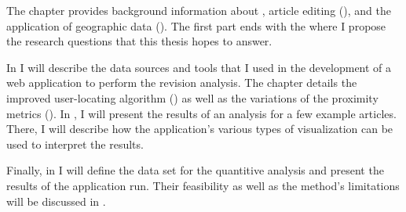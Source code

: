 The chapter  provides background information about , article editing (), and the application of geographic data ().
The first part ends with the  where I propose the research questions that this thesis hopes to answer.

In  I will describe the data sources and tools that I used in the development of a web application to perform the revision analysis. 
The chapter details the improved user-locating algorithm () as well as the variations of the proximity metrics ().
In , I will present the results of an analysis for a few example articles.
There, I will describe how the application's various types of visualization can be used to interpret the results.

Finally, in  I will define the data set for the quantitive analysis and present the results of the application run.
Their feasibility as well as the method's limitations will be discussed in .